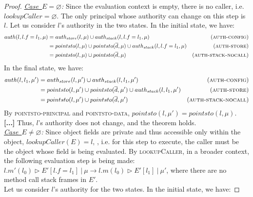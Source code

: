 \documentclass{llncs}
\newcommand{\todo}[1]{\textbf{[#1]}}
\begin{document}
\begin{proof}
\noindent\textit{\mbox{\underline{Case $E = \varnothing$}}:} Since the evaluation context is empty, there is no caller, i.e. $lookupCaller = \varnothing$. The only principal whose authority can change on this step is $l$. Let us consider $l$'s authority in the two states. In the initial state, we have:
\begin{align*}
auth(l, l.f = l_1, \mu) &= auth_{store}(l, \mu) \cup auth_{stack}(l, l.f = l_1, \mu) & (\textsc{auth-config})\\
&= pointsto(l, \mu) \cup pointsto(\overline{d}, \mu) \cup auth_{stack}(l, l.f = l_1, \mu) & (\textsc{auth-store})\\
&= pointsto(l, \mu) \cup pointsto(\overline{d}, \mu) & (\textsc{auth-stack-nocall})
\end{align*}
In the final state, we have:
\begin{align*}
auth(l, l_1, \mu') &= auth_{store}(l, \mu') \cup auth_{stack}(l, l_1, \mu') & (\textsc{auth-config})\\
&= pointsto(l, \mu') \cup pointsto(\overline{d}, \mu') \cup auth_{stack}(l, l_1, \mu') & (\textsc{auth-store})\\
&= pointsto(l, \mu') \cup pointsto(\overline{d}, \mu') & (\textsc{auth-stack-nocall})
\end{align*}
By \textsc{pointsto-principal} and \textsc{pointsto-data}, $pointsto(l, \mu') = pointsto(l, \mu)$. \todo{...} Thus, $l$'s authority does not change, and the theorem holds.\\

\noindent\textit{\mbox{\underline{Case $E \not= \varnothing$}}:} Since object fields are private and thus accessible only within the object, $lookupCaller(E) = l$, , i.e. for this step to execute, the caller must be the object whose field is being evaluated. By \textsc{lookupCaller}, in a broader context, the following evaluation step is being made: \mbox{$l.m'(l_0) \rhd E'[l.f = l_1]~|~\mu \longrightarrow l.m(l_0) \rhd E'[l_1]~|~\mu'$}, where there are no method call stack frames in $E'$.\\

\noindent Let us consider $l$'s authority for the two states. In the initial state, we have:


\end{proof}
\end{document}
